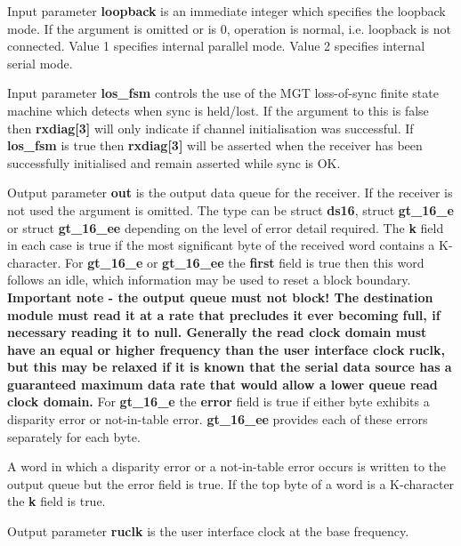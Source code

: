             Input parameter {\bf loopback} is an immediate integer which specifies
            the loopback mode. If the argument is omitted or is 0, operation is
            normal, i.e. loopback is not connected. Value 1 specifies internal
            parallel mode. Value 2 specifies internal serial mode.
            
            Input parameter {\bf los\_fsm} controls the use of the MGT loss-of-sync
            finite state machine which detects when sync is held/lost. If the argument
            to this is false then {\bf rxdiag[3]} will only indicate if channel
            initialisation was successful. If {\bf los\_fsm} is true then  {\bf
            rxdiag[3]} will be asserted when the receiver has been successfully
            initialised and remain asserted while sync is OK.

            Output parameter {\bf out} is the output data queue for the receiver.
            If the receiver is not used the argument is omitted. The type can be
            struct {\bf ds16}, struct {\bf gt\_16\_e} or  struct {\bf
            gt\_16\_ee} depending on the level of error
            detail required. The {\bf k} field in each case is true if the most
            significant byte of the received word contains a K-character.
            For {\bf gt\_16\_e} or  {\bf gt\_16\_ee} the {\bf first} field
            is true then this word follows an idle, which information may be
            used to reset a block boundary. {\bf Important note - the output
            queue must not block! The destination module must read it at a rate
            that precludes it ever becoming full, if necessary reading it to
            null. Generally the read clock domain must have an equal or higher
            frequency than the user interface clock {\bf ruclk}, but this may be
            relaxed if it is known that the serial data source has a guaranteed
            maximum data rate that would allow a lower queue read clock domain.}
            For {\bf gt\_16\_e} the {\bf error} field is true if either byte
            exhibits a disparity error or not-in-table error. {\bf gt\_16\_ee}
            provides each of these errors separately for each byte.
            
            A word in which a disparity error or a not-in-table error occurs is
            written to the output queue but the error field is true. If the top
            byte of a word is a K-character the {\bf k} field is true.

            Output parameter {\bf ruclk} is the user interface clock at the base
            frequency.
            
